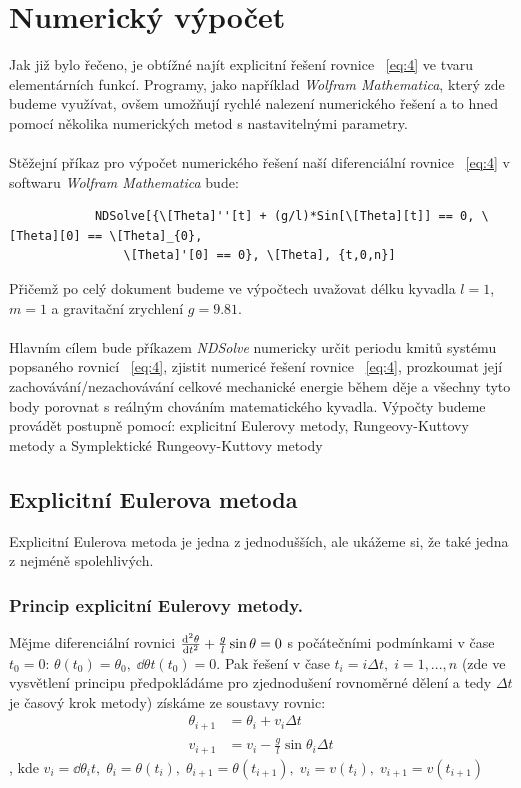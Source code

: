 \documentclass[reqno, a4paper]{amsart}
\begin{document}
		\section{Numerický výpočet}
		Jak již bylo řečeno, je obtížné najít explicitní řešení rovnice ~\eqref{eq:4} ve tvaru elementárních funkcí. Programy, jako například \textit{Wolfram Mathematica}, který zde budeme využívat, ovšem umožňují rychlé nalezení numerického řešení a to hned pomocí několika numerických metod s nastavitelnými parametry.\
		\\
		\\
		Stěžejní příkaz pro výpočet numerického řešení naší diferenciální rovnice ~\eqref{eq:4} v softwaru \textit{Wolfram Mathematica} bude:
		\begin{verbatim}
			NDSolve[{\[Theta]''[t] + (g/l)*Sin[\[Theta][t]] == 0, \[Theta][0] == \[Theta]_{0}, 
				\[Theta]'[0] == 0}, \[Theta], {t,0,n}]
		\end{verbatim}
		Přičemž po celý dokument budeme ve výpočtech uvažovat délku kyvadla $ l=1 $, $ m=1 $ a gravitační zrychlení $ g=9.81 $.
		\\
		\\
		Hlavním cílem bude příkazem \textit{NDSolve} numericky určit periodu kmitů systému popsaného rovnicí ~\eqref{eq:4}, zjistit numericé řešení rovnice ~\eqref{eq:4}, prozkoumat její zachovávání/nezachovávání celkové mechanické energie během děje a všechny tyto body porovnat s reálným chováním matematického kyvadla. Výpočty budeme provádět postupně pomocí: explicitní Eulerovy metody, Rungeovy-Kuttovy metody a Symplektické Rungeovy-Kuttovy metody
		\subsection{Explicitní Eulerova metoda}
		Explicitní Eulerova metoda je jedna z jednodušších, ale ukážeme si, že také jedna z nejméně spolehlivých.
		\\
		\subsubsection{Princip explicitní Eulerovy metody.} Mějme diferenciální rovnici $\frac{\mathrm{d}^2 {\theta}}{\mathrm{d} {t}^2} + \frac{g}{l} \sin \theta = 0$ s počátečními podmínkami v čase $t_{0}=0$: $\theta(t_{0})=\theta_{0},\; \dd{\theta}{t}(t_{0})=0$. Pak řešení v čase $t_{i}=i\Delta t,\; i=1,...,n$ (zde ve vysvětlení principu předpokládáme pro zjednodušení rovnoměrné dělení a tedy $ \Delta t$ je časový krok metody) získáme ze soustavy rovnic: 
		\begin{align}
			\theta_{i+1}& =\theta_{i}+v_{i}\Delta t\\
			v_{i+1}& =v_{i}-\frac{g}{l}\sin\theta_{i}\Delta t
		\end{align}
		, kde $ v_{i}=\dd{\theta_{i}}{t},\; \theta_{i}=\theta(t_{i}),\;\theta_{i+1}=\theta(t_{i+1}),\;v_{i}=v(t_{i}),\;v_{i+1}=v(t_{i+1})$
		\\
\end{document}
